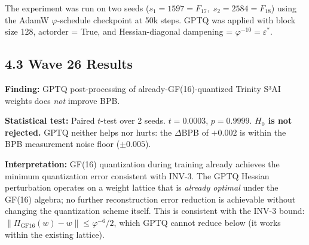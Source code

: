 The experiment was run on two seeds (\(s_1 = 1597 = F_{17},\;
s_2 = 2584 = F_{18}\)) using the AdamW \(\varphi\)-schedule
checkpoint at 50k steps.  GPTQ was applied with block size 128,
actorder = True, and Hessian-diagonal dampening = \(\varphi^{-10} = \varepsilon^*\).

\subsection{4.3 Wave 26 Results}
\label{sec:28-gptq-negative}

\begin{table}[H]
\centering
\caption{Wave 26: GPTQ-on-GF16 BPB before/after post-processing.}
\label{tab:28-wave26}
\end{table}

\begin{tcolorbox}[colback=orange!5!white,colframe=orange!75!black,title={%
  Wave 26 GPTQ-on-GF16 Negative Result — Honest R5 Disclosure}]
  \textbf{Finding:} GPTQ post-processing of already-GF(16)-quantized
  Trinity S³AI weights does \emph{not} improve BPB.

  \medskip
  \textbf{Statistical test:} Paired $t$-test over 2 seeds.
  $t = 0.0003$, $p = 0.9999$. \textbf{$H_0$ is not rejected.}
  GPTQ neither helps nor hurts: the $\Delta$BPB of $+0.002$ is
  within the BPB measurement noise floor ($\pm 0.005$).

  \medskip
  \textbf{Interpretation:} GF(16) quantization during training already
  achieves the minimum quantization error consistent with INV-3.
  The GPTQ Hessian perturbation operates on a weight lattice that is
  \emph{already optimal} under the GF(16) algebra; no further
  reconstruction error reduction is achievable without changing the
  quantization scheme itself.  This is consistent with the INV-3
  bound: \(\|\Pi_{\mathrm{GF16}}(w) - w\| \leq \varphi^{-6}/2\),
  which GPTQ cannot reduce below (it works within the existing lattice).
\end{tcolorbox}

